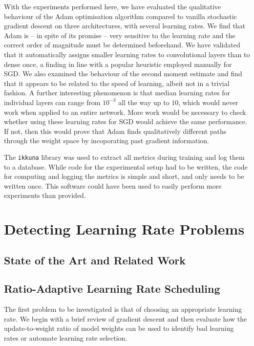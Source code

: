 With the experiments performed here, we have evaluated the qualitative behaviour
of the Adam optimisation algorithm compared to vanilla stochastic gradient
descent on three architectures, with several learning rates. We find that Adam
is -- in spite of its promise -- very sensitive to the learning rate and the
correct order of magnitude must be determined beforehand. We have validated that
it automatically assigns smaller learning rates to convolutional layers than to
dense once, a finding in line with a popular heuristic employed manually for
SGD. We also examined the behaviour of the second moment estimate and find that
it appears to be related to the speed of learning, albeit not in a trivial
fashion. A further interesting phenomenon is that median learning rates for
individual layers can range from $10^{-3}$ all the way up to $10$, which would
never work when applied to an entire network. More work would be necessary to
check whether using these learning rates for SGD would achieve the same
performance. If not, then this would prove that Adam finds qualitatively
different paths through the weight space by incoporating past gradient
information.

The \texttt{ikkuna} library was used to extract all metrics during training and
log them to a database. While code for the experimental setup had to be written,
the code for computing and logging the metrics is simple and short, and only
needs to be written once. This software could have been used to easily perform
more experiments than \citet{kingma2014adam} provided.

\section{Detecting Learning Rate Problems}%
\label{sec:detecting_learning_rate_problems}

\subsection{State of the Art and Related Work}%

\subsection{Ratio-Adaptive Learning Rate Scheduling}%
\label{sub:ratio_adaptive_learning_rate_scheduling}

The first problem to be investigated is that of choosing an appropriate learning
rate. We begin with a brief review of gradient descent and then evaluate how
the update-to-weight ratio of model weights can be used to identify bad learning
rates or automate learning rate selection.

